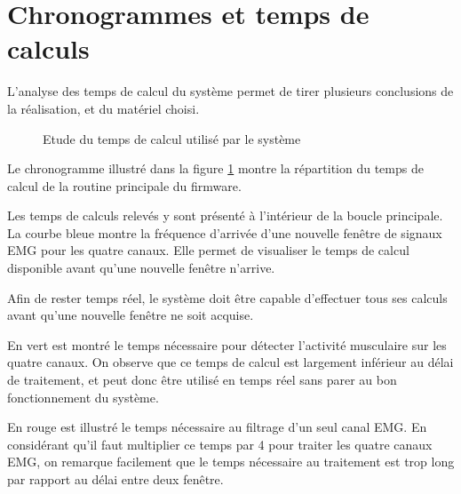 \documentclass[letterpaper, twoside, 12pt, memoire, creativecommons, hyperref]{thETS}
\begin{document}
\section{Chronogrammes et temps de calculs}

L'analyse des temps de calcul du système permet de tirer plusieurs conclusions de la réalisation, et du matériel choisi. 

\begin{figure}
	\centering
	\caption{Etude du temps de calcul utilisé par le système}
	\label{fig:chronogrammeDisc}
\end{figure}

Le chronogramme illustré dans la figure \ref{fig:chronogrammeDisc} montre la répartition du temps de calcul de la routine principale du firmware. 

Les temps de calculs relevés y sont présenté à l'intérieur de la boucle principale. La courbe bleue montre la fréquence d'arrivée d'une nouvelle fenêtre de signaux EMG pour les quatre canaux. Elle permet de visualiser le temps de calcul disponible avant qu'une nouvelle fenêtre n'arrive. 

Afin de rester temps réel, le système doit être capable d'effectuer tous ses calculs avant qu'une nouvelle fenêtre ne soit acquise. 

En vert est montré le temps nécessaire pour détecter l'activité musculaire sur les quatre canaux. On observe que ce temps de calcul est largement inférieur au délai de traitement, et peut donc être utilisé en temps réel sans parer au bon fonctionnement du système.

En rouge est illustré le temps nécessaire au filtrage d'un seul canal EMG. En considérant qu'il faut multiplier ce temps par 4 pour traiter les quatre canaux EMG, on remarque facilement que le temps nécessaire au traitement est trop long par rapport au délai entre deux fenêtre. 
\end{document}
